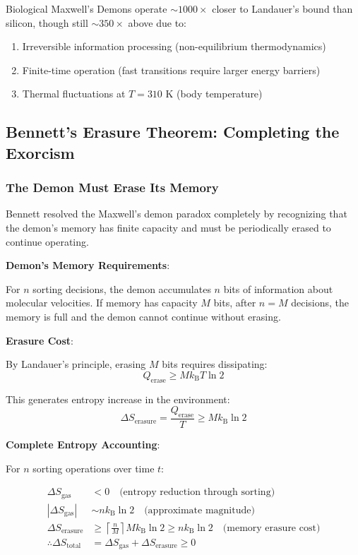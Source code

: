 \documentclass[11pt,a4paper]{article}
\newcommand{\kB}{k_\text{B}}
\begin{document}
Biological Maxwell's Demons operate $\sim 1000\times$ closer to Landauer's bound than silicon, though still $\sim 350\times$ above due to:
\begin{enumerate}
\item Irreversible information processing (non-equilibrium thermodynamics)
\item Finite-time operation (fast transitions require larger energy barriers)
\item Thermal fluctuations at $T = 310$ K (body temperature)
\end{enumerate}

\subsection{Bennett's Erasure Theorem: Completing the Exorcism}

\subsubsection{The Demon Must Erase Its Memory}

Bennett resolved the Maxwell's demon paradox completely by recognizing that the demon's memory has finite capacity and must be periodically erased to continue operating\cite{bennett1982thermodynamics}.

\textbf{Demon's Memory Requirements}:

For $n$ sorting decisions, the demon accumulates $n$ bits of information about molecular velocities. If memory has capacity $M$ bits, after $n = M$ decisions, the memory is full and the demon cannot continue without erasing.

\textbf{Erasure Cost}:

By Landauer's principle, erasing $M$ bits requires dissipating:
\begin{equation}
Q_{\text{erase}} \geq M \kB T \ln 2
\end{equation}

This generates entropy increase in the environment:
\begin{equation}
\Delta S_{\text{erasure}} = \frac{Q_{\text{erase}}}{T} \geq M \kB \ln 2
\end{equation}

\textbf{Complete Entropy Accounting}:

For $n$ sorting operations over time $t$:

\begin{align}
\Delta S_{\text{gas}} &< 0 \quad \text{(entropy reduction through sorting)} \\
|\Delta S_{\text{gas}}| &\sim n \kB \ln 2 \quad \text{(approximate magnitude)} \\
\Delta S_{\text{erasure}} &\geq \left\lceil \frac{n}{M} \right\rceil M \kB \ln 2 \geq n \kB \ln 2 \quad \text{(memory erasure cost)} \\
\therefore \Delta S_{\text{total}} &= \Delta S_{\text{gas}} + \Delta S_{\text{erasure}} \geq 0
\end{align}
\end{document}
